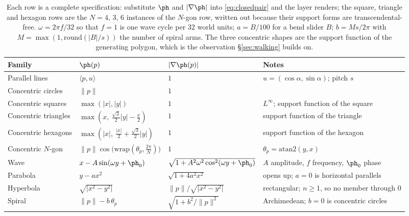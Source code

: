 \begin{table}[t]
  \centering
  \caption{ Each row is a complete
  specification: substitute $\ph$ and $\lvert\nabla\ph\rvert$ into
  \eqref{eq:closedpair} and the layer renders; the square, triangle and
  hexagon rows are the $N=4$, $3$, $6$ instances of the $N$-gon row, written
  out because their support forms are transcendental-free. $\omega=2\pi f/32$ so that
  $f=1$ is one wave cycle per $32$ world units; $a=B/100$ for a bend slider $B$;
  $b=Ms/2\pi$ with $M=\max(1,\mathrm{round}(\lvert B\rvert/s))$ the number of
  spiral arms. The three concentric shapes are the support function of the
  generating polygon, which is the observation \S\ref{sec:walking} builds on.}
  \label{tab:catalog}
  \small
  \begin{tabular}{@{}llll@{}}
    \toprule
    Family & $\ph(p)$ & $\lvert\nabla\ph(p)\rvert$ & Notes \\
    \midrule
    Parallel lines
      & $\langle p,u\rangle$
      & $1$
      & $u=(\cos\alpha,\sin\alpha)$; pitch $s$ \\
    Concentric circles
      & $\lVert p\rVert$
      & $1$
      & \\
    Concentric squares
      & $\max(\lvert x\rvert,\lvert y\rvert)$
      & $1$
      & $L^\infty$; support function of the square \\
    Concentric triangles
      & $\max\!\left(x,\ \tfrac{\sqrt3}{2}\lvert y\rvert-\tfrac{x}{2}\right)$
      & $1$
      & support function of the triangle \\
    Concentric hexagons
      & $\max\!\left(\lvert x\rvert,\ \tfrac{\lvert x\rvert}{2}+\tfrac{\sqrt3}{2}\lvert y\rvert\right)$
      & $1$
      & support function of the hexagon \\
    Concentric $N$-gon
      & $\lVert p\rVert\cos\!\big(\mathrm{wrap}(\theta_p,\tfrac{2\pi}{N})\big)$
      & $1$
      & $\theta_p=\mathrm{atan2}(y,x)$ \\
    Wave
      & $x-A\sin(\omega y+\ph_0)$
      & $\sqrt{1+A^2\omega^2\cos^2(\omega y+\ph_0)}$
      & $A$ amplitude, $f$ frequency, $\ph_0$ phase \\
    Parabola
      & $y-a x^2$
      & $\sqrt{1+4a^2x^2}$
      & opens up; $a=0$ is horizontal parallels \\
    Hyperbola
      & $\sqrt{\lvert x^2-y^2\rvert}$
      & $\lVert p\rVert/\sqrt{\lvert x^2-y^2\rvert}$
      & rectangular; $n\ge1$, so no member through $0$ \\
    Spiral
      & $\lVert p\rVert-b\,\theta_p$
      & $\sqrt{1+b^2/\lVert p\rVert^2}$
      & Archimedean; $b=0$ is concentric circles \\
    \bottomrule
  \end{tabular}
\end{table}

